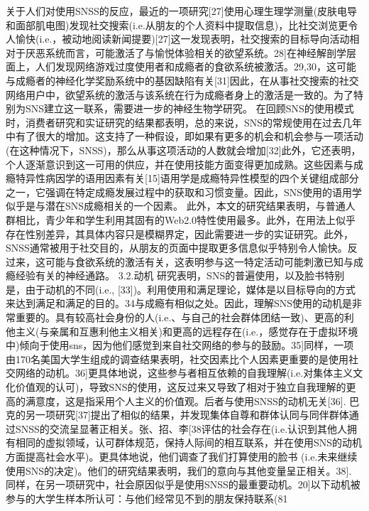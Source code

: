 关于人们对使用SNSS的反应，最近的一项研究[27]使用心理生理学测量(皮肤电导和面部肌电图)发现社交搜索(i.e.从朋友的个人资料中提取信息)，比社交浏览更令人愉快(i.e.，被动地阅读新闻提要)[27]这一发现表明，社交搜索的目标导向活动相对于厌恶系统而言，可能激活了与愉悦体验相关的欲望系统。28]在神经解剖学层面上，人们发现网络游戏过度使用者和成瘾者的食欲系统被激活。29,30，这可能与成瘾者的神经化学奖励系统中的基因缺陷有关[31]因此，在从事社交搜索的社交网络用户中，欲望系统的激活与该系统在行为成瘾者身上的激活是一致的。为了特别为SNS建立这一联系，需要进一步的神经生物学研究。
在回顾SNS的使用模式时，消费者研究和实证研究的结果都表明，总的来说，SNS的常规使用在过去几年中有了很大的增加。这支持了一种假设，即如果有更多的机会和机会参与一项活动(在这种情况下，SNSS)，那么从事这项活动的人数就会增加[32]此外，它还表明，个人逐渐意识到这一可用的供应，并在使用技能方面变得更加成熟。这些因素与成瘾特异性病因学的语用因素有关[15]语用学是成瘾特异性模型的四个关键组成部分之一，它强调在特定成瘾发展过程中的获取和习惯变量。因此，SNS使用的语用学似乎是与潜在SNS成瘾相关的一个因素。
此外，本文的研究结果表明，与普通人群相比，青少年和学生利用其固有的Web2.0特性使用最多。此外，在用法上似乎存在性别差异，其具体内容只是模糊界定，因此需要进一步的实证研究。此外，SNSS通常被用于社交目的，从朋友的页面中提取更多信息似乎特别令人愉快。反过来，这可能与食欲系统的激活有关，这表明参与这一特定活动可能刺激已知与成瘾经验有关的神经通路。
3.2.动机
研究表明，SNS的普遍使用，以及脸书特别是，由于动机的不同(i.e., [33])。利用使用和满足理论，媒体是以目标导向的方式来达到满足和满足的目的。34与成瘾有相似之处。因此，理解SNS使用的动机是非常重要的。具有较高社会身份的人(i.e.、与自己的社会群体团结一致)、更高的利他主义(与亲属和互惠利他主义相关)和更高的远程存在(i.e.，感觉存在于虚拟环境中)倾向于使用sns，因为他们感觉到来自社交网络的参与的鼓励。35]同样，一项由170名美国大学生组成的调查结果表明，社交因素比个人因素更重要的是使用社交网络的动机。36]更具体地说，这些参与者相互依赖的自我理解(i.e.对集体主义文化价值观的认可)，导致SNS的使用，这反过来又导致了相对于独立自我理解的更高的满意度，这是指采用个人主义的价值观。后者与使用SNSS的动机无关[36].
巴克的另一项研究[37]提出了相似的结果，并发现集体自尊和群体认同与同伴群体通过SNSS的交流呈显著正相关。张、招、李[38评估的社会存在(i.e.认识到其他人拥有相同的虚拟领域，认可群体规范，保持人际间的相互联系，并在使用SNS的动机方面提高社会水平)。更具体地说，他们调查了我们打算使用的脸书 (i.e.未来继续使用SNS的决定)。他们的研究结果表明，我们的意向与其他变量呈正相关。38].
同样，在另一项研究中，社会原因似乎是使用SNSS的最重要动机。20]以下动机被参与的大学生样本所认可：与他们经常见不到的朋友保持联系(81%
